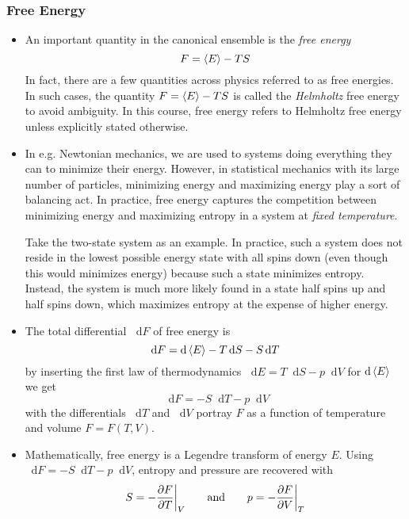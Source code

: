\documentclass[11pt, a4paper]{article}
\newcommand{\diff}{\mathop{}\!\mathrm{d}} %
\begin{document}
\subsubsection{Free Energy}
\begin{itemize}
	\item An important quantity in the canonical ensemble is the \textit{free energy}
	\begin{equation*}
		F = \expval{E} - TS
	\end{equation*}
 	In fact, there are a few quantities across physics referred to as free energies. In such cases, the quantity $ F = \expval{E} - TS$ is called the \textit{Helmholtz} free energy to avoid ambiguity. In this course, free energy refers to Helmholtz free energy unless explicitly stated otherwise.
	
	\item In e.g. Newtonian mechanics, we are used to systems doing everything they can to minimize their energy. However, in statistical mechanics with its large number of particles, minimizing energy and maximizing energy play a sort of balancing act. In practice, free energy captures the competition between minimizing energy and maximizing entropy in a system at \textit{fixed temperature}. 
	
	Take the two-state system as an example. In practice, such a system does not reside in the lowest possible energy state with all spins down (even though this would minimizes energy) because such a state minimizes entropy. Instead, the system is much more likely found in a state half spins up and half spins down, which maximizes entropy at the expense of higher energy.
	
	\item The total differential $ \diff F $ of free energy is
	\begin{equation*}
		\diff F = \diff \expval{E} - T \diff S - S \diff T
	\end{equation*}
	by inserting the first law of thermodynamics $ \diff E = T\diff S - p \diff V $ for $ \diff \expval{E} $ we get
	\begin{equation*}
		\diff F = - S \diff T - p \diff V
	\end{equation*}
	with the differentials $ \diff T $ and $ \diff V $ portray $ F $ as a function of temperature and volume $ F = F(T, V) $. 
	
	\item Mathematically, free energy is a Legendre transform of energy $ E $. Using $ \diff F = - S \diff T - p \diff V $, entropy and pressure are recovered with 
	\begin{equation*}
		S = -\pdv{F}{T}\bigg |_{V} \qquad \text{and} \qquad p = - \pdv{F}{V}\bigg |_{T}
	\end{equation*}
	

\end{itemize}
\end{document}
